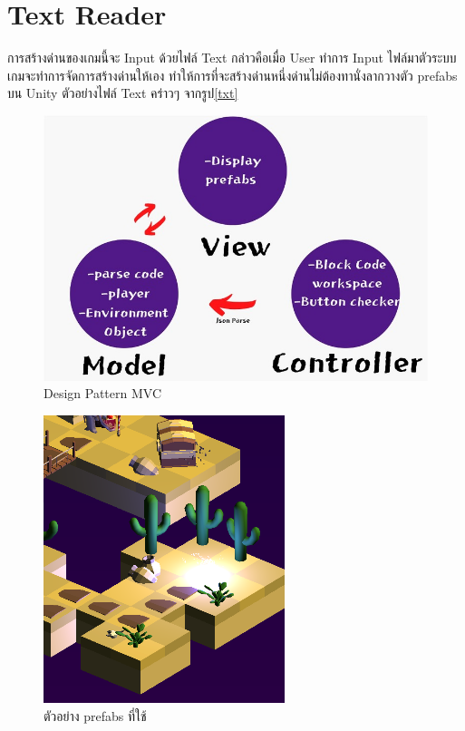 \section{Text Reader}
การสร้างด่านของเกมนี้จะ Input ด้วยไฟล์ Text กล่าวคือเมื่อ User ทำการ Input ไฟล์มาตัวระบบเกมจะทำการจัดการสร้างด่านให้เอง
ทำให้การที่จะสร้างด่านหนึ่งด่านไม่ต้องทานั่งลากวางตัว prefabs บน Unity ตัวอย่างไฟล์ Text คร่าวๆ จากรูป\ref{txt}

\begin{figure}[h!]
\begin{center}
\includegraphics{pic/pic1.jpg}
\end{center}
\caption[Design Pattern MVC]{Design Pattern MVC}
\label{mvc}
\end{figure}

\begin{figure}[h!]
\begin{center}
\includegraphics{pic/prefap.PNG}
\end{center}
\caption[ตัวอย่าง prefabs ที่ใช้]{ตัวอย่าง prefabs ที่ใช้ }
\label{prefabs}
\end{figure}

